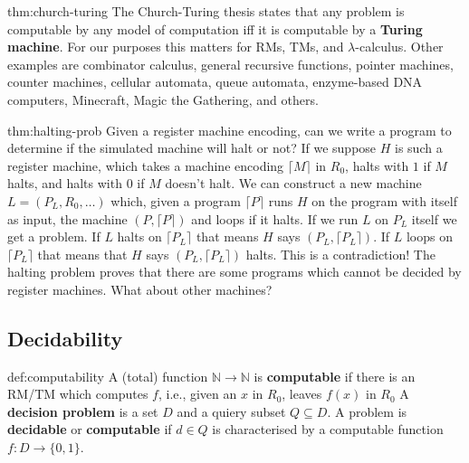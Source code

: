 \documentclass[landscape, 8pt]{extarticle}
\begin{document}
\begin{multicols}{3}
\begin{thm}{thm:church-turing}{}
The Church-Turing thesis states that any problem is computable by any model of computation iff it is computable by a \textbf{Turing machine}. \newline
For our purposes this matters for RMs, TMs, and $\lambda$-calculus. \newline
Other examples are combinator calculus, general recursive functions, pointer machines, counter machines, cellular automata, queue automata, enzyme-based
DNA computers, Minecraft, Magic the Gathering, and others.
\end{thm}


\begin{thm}{thm:halting-prob}{}
Given a register machine encoding, can we write a program to determine if the simulated machine will halt or not? \newline
If we suppose $H$ is such a register machine, which takes a machine encoding $\lceil M \rceil$ in $R_{0}$, halts with $1$ if $M$ halts, and halts with $0$ if $M$ doesn't halt. \newline
We can construct a new machine $L = (P_{L}, R_{0},\dots)$ which, given a program $\lceil P \rceil $ runs $H$ on the program with itself as input, the machine $(P, \lceil P \rceil )$ and loops if it halts. \newline
If we run $L$ on $P_{L}$ itself we get a problem. If $L$ halts on $\lceil P_{L} \rceil $ that means $H$ says $(P_{L}, \lceil P_{L} \rceil )$. If $L$ loops on $\lceil P_{L} \rceil $ that means that $H$ says $(P_{L}, \lceil P_{L} \rceil )$ halts.\newline
This is a contradiction! \newline
The halting problem proves that there are some programs which cannot be decided by register machines. What about other machines?
\end{thm}


\vspace*{-10pt}
\subsection*{Decidability}

\begin{dfn}[Computability]{def:computability}{}
A (total) function $\mathbb{N}\to\mathbb{N}$ is \textbf{computable} if there is an RM/TM which computes $f$, i.e., given an $x$ in $R_{0}$, leaves $f(x)$ in $R_{0}$\newline
A \textbf{decision problem} is a set $D$ and a quiery subset $Q\subseteq D$. A problem is \textbf{decidable} or \textbf{computable} if $d\in Q$ is characterised by a computable function $f : D\to \{0, 1\}$.
\end{dfn}


\end{multicols}
\end{document}

